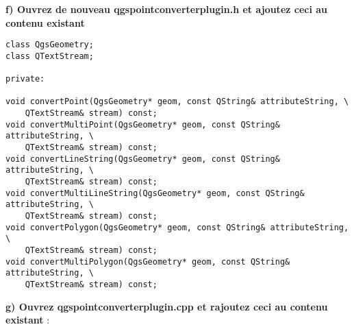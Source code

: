 \textbf{f) Ouvrez de nouveau qgspointconverterplugin.h et ajoutez ceci au contenu existant}

\begin{verbatim}
class QgsGeometry;
class QTextStream;

private:

void convertPoint(QgsGeometry* geom, const QString& attributeString, \
    QTextStream& stream) const;
void convertMultiPoint(QgsGeometry* geom, const QString& attributeString, \
    QTextStream& stream) const;
void convertLineString(QgsGeometry* geom, const QString& attributeString, \
    QTextStream& stream) const;
void convertMultiLineString(QgsGeometry* geom, const QString& attributeString, \
    QTextStream& stream) const;
void convertPolygon(QgsGeometry* geom, const QString& attributeString, \
    QTextStream& stream) const;
void convertMultiPolygon(QgsGeometry* geom, const QString& attributeString, \
    QTextStream& stream) const;
\end{verbatim}

\textbf{g) Ouvrez qgspointconverterplugin.cpp et rajoutez ceci au contenu existant} :

